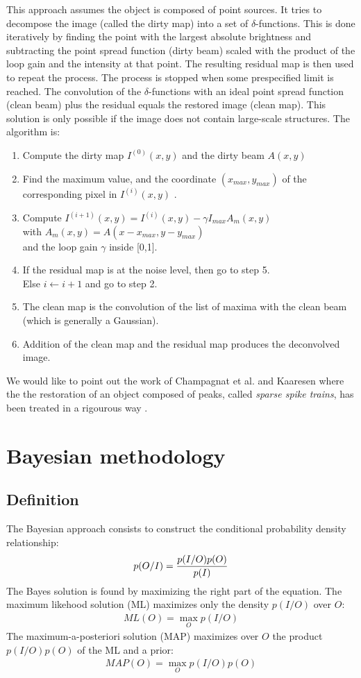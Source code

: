 \documentclass[11pt,a4paper]{article}
\newcommand{\be}{\begin{eqnarray}}
\newcommand{\ee}{\end{eqnarray}}
\begin{document}
This approach assumes the object is composed of point sources.
It tries to decompose the image (called the dirty map)
 into a set of $\delta$-functions. 
This is done iteratively by finding the point with the largest
absolute brightness and subtracting the point spread function (dirty beam)
scaled with the product of the loop gain and the intensity at that
point. The resulting residual map is then used to repeat the
process. The process is stopped when some prespecified limit 
is reached. The convolution of the $\delta$-functions with an ideal 
point spread function 
(clean beam) plus the residual equals the restored image (clean map). 
This solution is only possible if the image does not contain
large-scale structures.  
The algorithm is:
\begin{enumerate}
\item Compute the dirty map  $I^{(0)}(x,y)$ and the dirty beam $A(x,y)$\\
\item Find the maximum value, and the coordinate $(x_{max},y_{max})$ of
the corresponding pixel in $I^{(i)}(x,y)$ .
\item Compute $I^{(i+1)}(x,y) = I^{(i)}(x,y) - \gamma I_{max} A_m(x,y)$ \\
      with $A_m(x,y)= A(x-x_{max}, y-y_{max})$ \\
      and the loop gain $\gamma$ inside [0,1].
\item If the residual map is at the noise level, then go to step 5. \\
      Else $i \longleftarrow i+1$ and go to step 2.
\item The clean map is the convolution of the list of maxima 
with the clean beam  (which is generally a Gaussian).
\item Addition of the clean map and the residual map 
  produces the deconvolved image. 
\end{enumerate}

We would like to point out the work of Champagnat et al. \cite*{rest:idier96}
and Kaaresen \cite{rest:kaaresen97} where the 
the restoration of an object composed of peaks, called 
{\em sparse spike trains}, has been treated
in a rigourous way \cite{rest:idier96,rest:kaaresen97}.

\section{Bayesian methodology}
\subsection{Definition}
The Bayesian approach consists to construct the conditional probability
density relationship:
\be
p(O/I) = {p(I/O) p(O) \over p(I)}
\ee
The Bayes solution is found by maximizing the right part of the equation.
The maximum likehood solution (ML) maximizes only the density $p(I/O)$ over $O$:
\be
ML(O) = \max_O  p(I/O)
\ee
The  maximum-a-posteriori solution (MAP) maximizes over $O$ 
the product $p(I/O) p(O)$ of the ML and a prior:
\be
MAP(O)  = \max_O  p(I/O) p(O)
\ee
\end{document}
